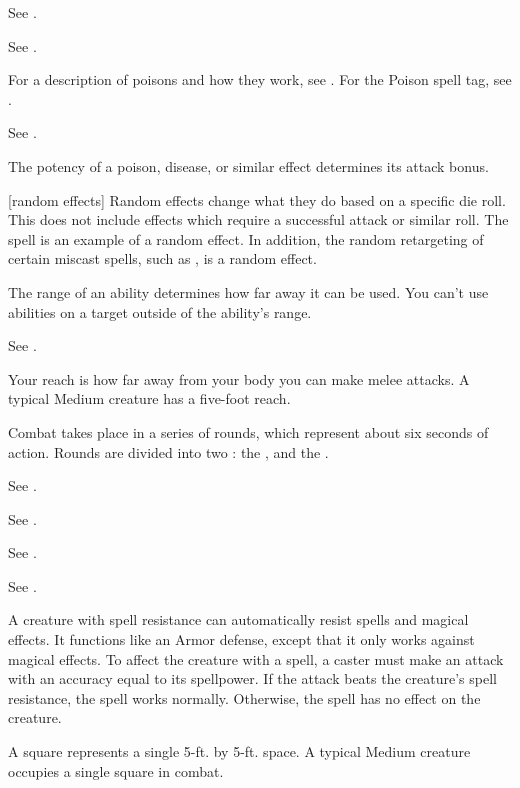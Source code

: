  See .

 See .

 For a description of poisons and how they work, see . For the Poison spell tag, see .

 See .

 The potency of a poison, disease, or similar effect determines its attack bonus.

[random effects] Random effects change what they do based on a specific die roll.
This does not include effects which require a successful attack or similar roll.
The  spell is an example of a random effect.
In addition, the random retargeting of certain miscast spells, such as , is a random effect.

 The range of an ability determines how far away it can be used.
You can't use abilities on a target outside of the ability's range.

 See .

 Your reach is how far away from your body you can make melee attacks.
A typical Medium creature has a five-foot reach.

 Combat takes place in a series of rounds, which represent about six seconds of action.
Rounds are divided into two : the , and the .

 See .

 See .

 See .

 See .

 A creature with spell resistance can automatically resist spells and magical effects.
It functions like an Armor defense, except that it only works against magical effects.
To affect the creature with a spell, a caster must make an attack with an accuracy equal to its spellpower.
If the attack beats the creature's spell resistance, the spell works normally.
Otherwise, the spell has no effect on the creature.

 A square represents a single 5-ft. by 5-ft. space.
A typical Medium creature occupies a single square in combat.

